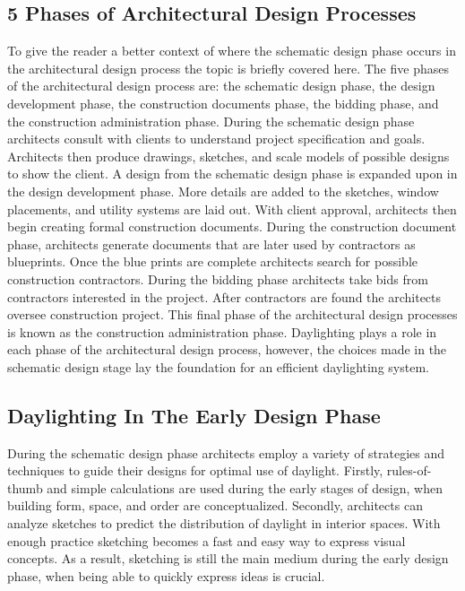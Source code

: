   \subsection{5 Phases of Architectural Design Processes} 
  To give the reader a better context of where the schematic design phase occurs in the architectural design process the topic is briefly covered here.
  The five phases of the architectural design process are: the schematic design phase, the design development phase, the construction documents phase, the bidding phase, and the construction administration phase.
  During the schematic design phase architects consult with clients to understand project specification and goals. Architects then produce drawings, sketches, and scale models of possible designs to show the client.
  A design from the schematic design phase is expanded upon in the design development phase.
  More details are added to the sketches, window placements, and utility systems are laid out.
  With client approval, architects then begin creating formal construction documents. During the construction document phase, architects generate documents that are later used by contractors as blueprints.
  Once the blue prints are complete architects search for possible construction contractors.
  During the bidding phase architects take bids from contractors interested in the project.
  After contractors are found the architects oversee construction project.
  This final phase of the architectural design processes is known as the construction administration phase.
  Daylighting plays a role in each phase of the architectural design process, however, the choices made in the schematic design stage lay the foundation for an efficient daylighting system.

  \subsection{Daylighting In The Early Design Phase}
  During the schematic design phase architects employ a variety of strategies and techniques to guide their designs for optimal use of daylight.
  Firstly, rules-of-thumb and simple calculations are used during the early stages of design, when building form, space, and order are conceptualized.
  Secondly, architects can analyze sketches to predict the distribution of daylight in interior spaces.
  With enough practice sketching becomes a fast and easy way to express visual concepts.
  As a result, sketching is still the main medium during the early design phase, when being able to quickly express ideas is crucial.

